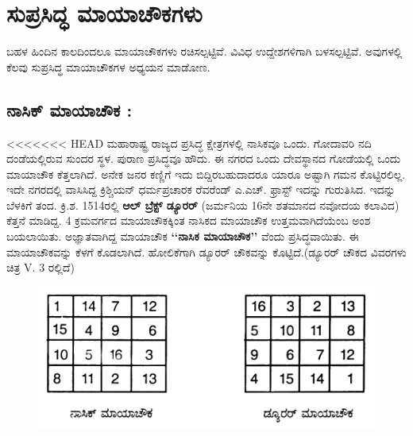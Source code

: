\chapter{ಸುಪ್ರಸಿದ್ಧ ಮಾಯಾಚೌಕಗಳು}

ಬಹಳ ಹಿಂದಿನ ಕಾಲದಿಂದಲೂ ಮಾಯಾಚೌಕಗಳು ರಚಿಸಲ್ಪಟ್ಟಿವೆ. ವಿವಿಧ ಉದ್ದೇಶಗಳಿಗಾಗಿ ಬಳಸಲ್ಪಟ್ಟಿವೆ. ಅವುಗಳಲ್ಲಿ ಕೆಲವು ಸುಪ್ರಸಿದ್ಧ ಮಾಯಾಚೌಕಗಳ ಅಧ್ಯಯನ ಮಾಡೋಣ.

\section*{ನಾಸಿಕ್ ಮಾಯಾಚೌಕ :}

<<<<<<< HEAD
ಮಹಾರಾಷ್ಟ್ರ ರಾಜ್ಯದ ಪ್ರಸಿದ್ಧ ಕ್ಷೇತ್ರಗಳಲ್ಲಿ ನಾಸಿಕವೂ ಒಂದು. ಗೋದಾವರಿ ನದಿ ದಂಡೆಯಲ್ಲಿರುವ ಸುಂದರ ಸ್ಥಳ. ಪುರಾಣ ಪ್ರಸಿದ್ಧವೂ ಹೌದು. ಈ ನಗರದ ಒಂದು ದೇವಸ್ಥಾನದ ಗೋಡೆಯಲ್ಲಿ ಒಂದು ಮಾಯಾಚೌಕ ಕೆತ್ತಲಾಗಿದೆ. ಅನೇಕ ಜನರ ಕಣ್ಣಿಗೆ ಇದು ಬಿದ್ದಿರಬಹುದಾದರೂ ಯಾರೂ ಅಷ್ಟಾಗಿ ಗಮನ ಕೊಟ್ಟಿರಲಿಲ್ಲ. ಇದೇ ನಗರದಲ್ಲಿ ವಾಸಿಸಿದ್ದ ಕ್ರಿಶ್ಚಿಯನ್ ಧರ್ಮಪ್ರಚಾರಕ ರೆವರೆಂಡ್ ಎ.ಎಚ್. ಫ್ರಾಸ್ಟ್ ಇದನ್ನು ಗುರುತಿಸಿದ. ಇದನ್ನು ಬೆಳಕಿಗೆ ತಂದ. ಕ್ರಿ.ಶ. 1514ರಲ್ಲಿ \textbf{ಆಲ್ ಬ್ರೆಕ್ಟ್ ಡ್ಯೂರರ್} (ಜರ್ಮನಿಯ 16ನೇ ಶತಮಾನದ ನವೋದಯ ಕಲಾವಿದ) ಕೆತ್ತನೆ ಮಾಡಿದ್ದ. 4 ಕ್ರಮವರ್ಗದ ಮಾಯಾಚೌಕಕ್ಕಿಂತ ನಾಸಿಕದ ಮಾಯಾಚೌಕ ಉತ್ತಮವಾಗಿದೆಯೆಂಬ ಅಂಶ ಬಯಲಾಯಿತು. ಅಜ್ಞಾತವಾಗಿದ್ದ ಮಾಯಾಚೌಕ \textbf{‘‘ನಾಸಿಕ ಮಾಯಾಚೌಕ’’} ವೆಂದು ಪ್ರಸಿದ್ಧವಾಯಿತು. ಈ ಮಾಯಾಚೌಕವನ್ನು ಕೆಳಗೆ ಕೊಡಲಾಗಿದೆ. ಹೋಲಿಕೆಗಾಗಿ ಡ್ಯೂರರ್ ಚೌಕವನ್ನು ಕೊಟ್ಟಿದೆ.(ಡ್ಯೂರರ್ ಚೌಕದ ವಿವರಗಳು ಚಿತ್ರ V. 3 ರಲ್ಲಿದೆ)
\begin{figure}[H]
\includegraphics{src/figures/chap4/fig4-1.jpg}
\end{figure}
